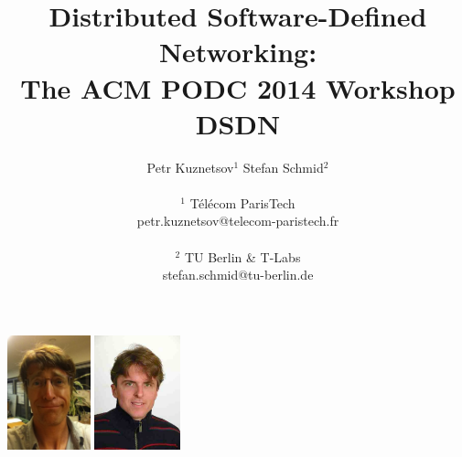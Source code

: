 \documentclass[11pt,pdftex,letter]{article}
\begin{document}
\sloppy




\title{Distributed Software-Defined Networking:\\ The ACM PODC 2014 Workshop \textbf{DSDN}}



\author{
Petr Kuznetsov$^{1}$ \quad Stefan Schmid$^{2}$\\
\\
       $^{1}$ T\'el\'ecom ParisTech\\
        petr.kuznetsov@telecom-paristech.fr\\
\\
        $^{2}$ TU Berlin \& T-Labs \\ %
	    stefan.schmid@tu-berlin.de}


\date{}




\maketitle

\begin{center}

\includegraphics[height=1.3in]{petr.jpg}
\hspace{1cm}
\includegraphics[height=1.3in]{stefan.jpg}
\end{center}
\end{document}
